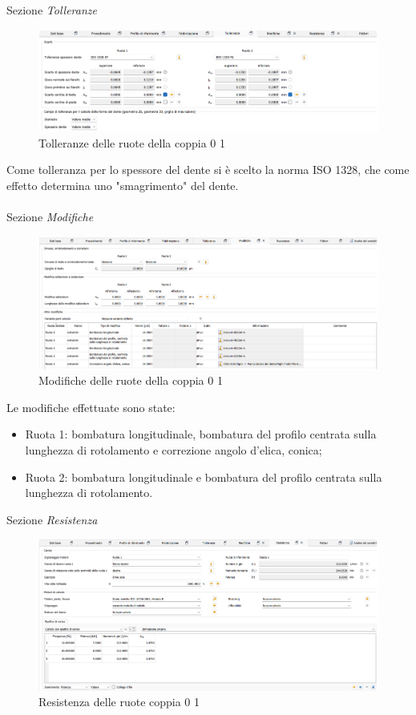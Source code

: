 Sezione \emph{Tolleranze}
\begin{figure}[h]
    \centering
    \includegraphics[scale=0.47]{Immagini/TolleranzeCoppia01.png}
    \caption{Tolleranze delle ruote della coppia 0 1}
    \label{fig:TolleranzeCoppia01}
\end{figure}

Come tolleranza per lo spessore del dente si è scelto la norma ISO 1328, che come effetto determina uno "smagrimento" del dente.\\
\\
Sezione \emph{Modifiche}
\begin{figure}[h]
    \centering
    \includegraphics[scale=0.47]{Immagini/ModificheCoppia01.png}
    \caption{Modifiche delle ruote della coppia 0 1}
    \label{fig:ModificheCoppia01}
\end{figure}

Le modifiche effettuate sono state:
\begin{itemize}
    \item Ruota 1: bombatura longitudinale, bombatura del profilo centrata sulla lunghezza di rotolamento e correzione angolo d’elica, conica;
    \item Ruota 2: bombatura longitudinale e bombatura del profilo centrata sulla lunghezza di rotolamento. 
\end{itemize}
\newpage
Sezione \emph{Resistenza}
\begin{figure}[h]
    \centering
    \includegraphics[scale=0.47]{Immagini/ResistenzaCoppia01.png}
    \caption{Resistenza delle ruote coppia 0 1}
    \label{fig:ResistenzaCoppia01}
\end{figure}

